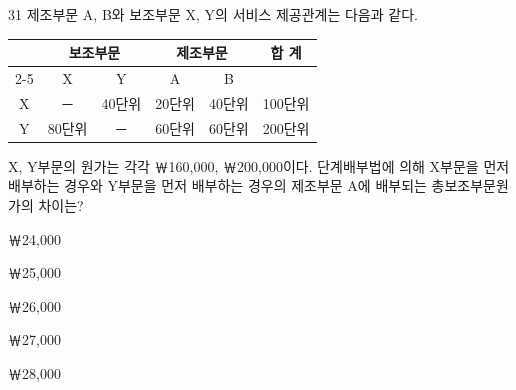 \begin{question}{31}
제조부문 A, B와 보조부문 X, Y의 서비스 제공관계는 다음과 같다.
\begin{center}
\small
\begin{tabular}{|c|c|c|c|c|c|}
\hline
 & \multicolumn{2}{c|}{보조부문} & \multicolumn{2}{c|}{제조부문} & \multirow{2}{*}{합 계} \\
\cline{2-5}
 & X & Y & A & B & \\
\hline
X & － & 40단위 & 20단위 & 40단위 & 100단위 \\
\hline
Y & 80단위 & － & 60단위 & 60단위 & 200단위 \\
\hline
\end{tabular}
\end{center}
X, Y부문의 원가는 각각 ￦160,000, ￦200,000이다. 단계배부법에 의해 X부문을 먼저 배부하는 경우와 Y부문을 먼저 배부하는 경우의 제조부문 A에 배부되는 총보조부문원가의 차이는? \par
\begin{choices}
  \item ￦24,000
  \item ￦25,000
  \item ￦26,000
  \item ￦27,000
  \item ￦28,000
\end{choices}
\end{question}
